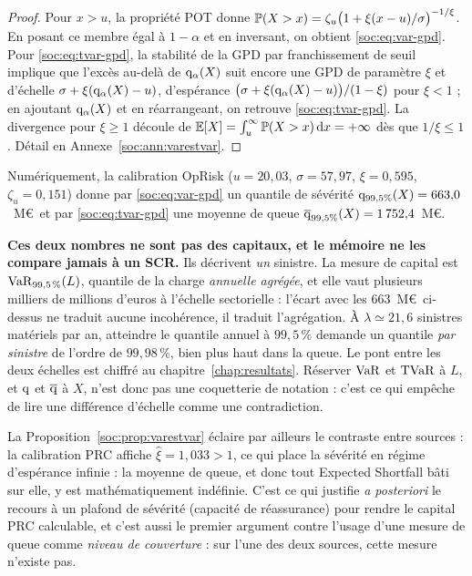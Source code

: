 \begin{proof}
Pour $x>u$, la propriété POT donne $\mathbb{P}(X>x)=\zeta_u\bigl(1+\xi(x-u)/\sigma\bigr)^{-1/\xi}$. En posant ce membre égal à $1-\alpha$ et en inversant, on obtient \eqref{soc:eq:var-gpd}. Pour \eqref{soc:eq:tvar-gpd}, la stabilité de la GPD par franchissement de seuil implique que l'excès au-delà de $\mathrm{q}_\alpha(X)$ suit encore une GPD de paramètre $\xi$ et d'échelle $\sigma+\xi(\mathrm{q}_\alpha(X)-u)$, d'espérance $\bigl(\sigma+\xi(\mathrm{q}_\alpha(X)-u)\bigr)/(1-\xi)$ pour $\xi<1$ ; en ajoutant $\mathrm{q}_\alpha(X)$ et en réarrangeant, on retrouve \eqref{soc:eq:tvar-gpd}. La divergence pour $\xi\ge1$ découle de $\mathbb{E}[X]=\int_u^\infty \mathbb{P}(X>x)\,\mathrm{d} x=+\infty$ dès que $1/\xi\le1$. Détail en Annexe~\ref{soc:ann:varestvar}.
\end{proof}

\noindent Numériquement, la calibration OpRisk ($u=20{,}03$, $\sigma=57{,}97$, $\xi=0{,}595$, $\zeta_u=0{,}151$) donne par \eqref{soc:eq:var-gpd} un quantile de sévérité $\mathrm{q}_{99{,}5\%}(X)=663{,}0$~M\euro\ et par \eqref{soc:eq:tvar-gpd} une moyenne de queue $\overline{\mathrm{q}}_{99{,}5\%}(X)=1\,752{,}4$~M\euro.

\begin{attention}
\textbf{Ces deux nombres ne sont pas des capitaux, et le mémoire ne les compare jamais à un SCR.}
Ils décrivent \emph{un} sinistre. La mesure de capital est $\mathrm{VaR}_{99{,}5\,\%}(L)$, quantile de la
charge \emph{annuelle agrégée}, et elle vaut plusieurs milliers de millions d'euros à l'échelle
sectorielle : l'écart avec les $663$~M\euro\ ci-dessus ne traduit aucune incohérence, il traduit
l'agrégation. À $\lambda\simeq21{,}6$ sinistres matériels par an, atteindre le quantile annuel à
$99{,}5\,\%$ demande un quantile \emph{par sinistre} de l'ordre de $99{,}98\,\%$, bien plus haut
dans la queue. Le pont entre les deux échelles est chiffré au chapitre~\ref{chap:resultats}.
Réserver $\mathrm{VaR}$ et $\mathrm{TVaR}$ à $L$, et $\mathrm{q}$ et $\overline{\mathrm{q}}$ à
$X$, n'est donc pas une coquetterie de notation : c'est ce qui empêche de lire une différence
d'échelle comme une contradiction.
\end{attention}

\noindent La Proposition~\ref{soc:prop:varestvar} éclaire par ailleurs le contraste entre sources : la calibration PRC affiche $\hat\xi=1{,}033>1$, ce qui place la sévérité en régime d'espérance infinie : la moyenne de queue, et donc tout Expected Shortfall bâti sur elle, y est mathématiquement indéfinie. C'est ce qui justifie \emph{a posteriori} le recours à un plafond de sévérité (capacité de réassurance) pour rendre le capital PRC calculable, et c'est aussi le premier argument contre l'usage d'une mesure de queue comme \emph{niveau de couverture} : sur l'une des deux sources, cette mesure n'existe pas.

